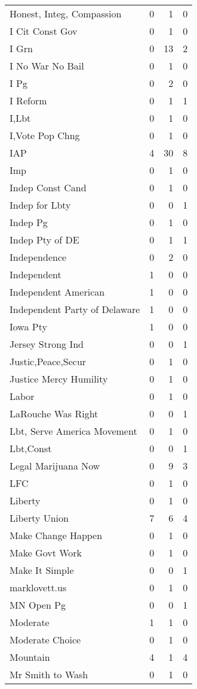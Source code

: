 \begin{supertabular}{lrrr}
Honest, Integ, Compassion & 0 & 1 & 0\\
I Cit Const Gov & 0 & 1 & 0\\
I Grn & 0 & 13 & 2\\
I No War No Bail & 0 & 1 & 0\\
I Pg & 0 & 2 & 0\\
I Reform & 0 & 1 & 1\\
I,Lbt & 0 & 1 & 0\\
I,Vote Pop Chng & 0 & 1 & 0\\
IAP & 4 & 30 & 8\\
Imp & 0 & 1 & 0\\
Indep Const Cand & 0 & 1 & 0\\
Indep for Lbty & 0 & 0 & 1\\
Indep Pg & 0 & 1 & 0\\
Indep Pty of DE & 0 & 1 & 1\\
Independence & 0 & 2 & 0\\
Independent & 1 & 0 & 0\\
Independent American & 1 & 0 & 0\\
Independent Party of Delaware & 1 & 0 & 0\\
Iowa Pty & 1 & 0 & 0\\
Jersey Strong Ind & 0 & 0 & 1\\
Justic,Peace,Secur & 0 & 1 & 0\\
Justice Mercy Humility & 0 & 1 & 0\\
Labor & 0 & 1 & 0\\
LaRouche Was Right & 0 & 0 & 1\\
Lbt, Serve America Movement & 0 & 1 & 0\\
Lbt,Const & 0 & 0 & 1\\
Legal Marijuana Now & 0 & 9 & 3\\
LFC & 0 & 1 & 0\\
Liberty & 0 & 1 & 0\\
Liberty Union & 7 & 6 & 4\\
Make Change Happen & 0 & 1 & 0\\
Make Govt Work & 0 & 1 & 0\\
Make It Simple & 0 & 0 & 1\\
marklovett.us & 0 & 1 & 0\\
MN Open Pg & 0 & 0 & 1\\
Moderate & 1 & 1 & 0\\
Moderate Choice & 0 & 1 & 0\\
Mountain & 4 & 1 & 4\\
Mr Smith to Wash & 0 & 1 & 0\\

\end{supertabular}
